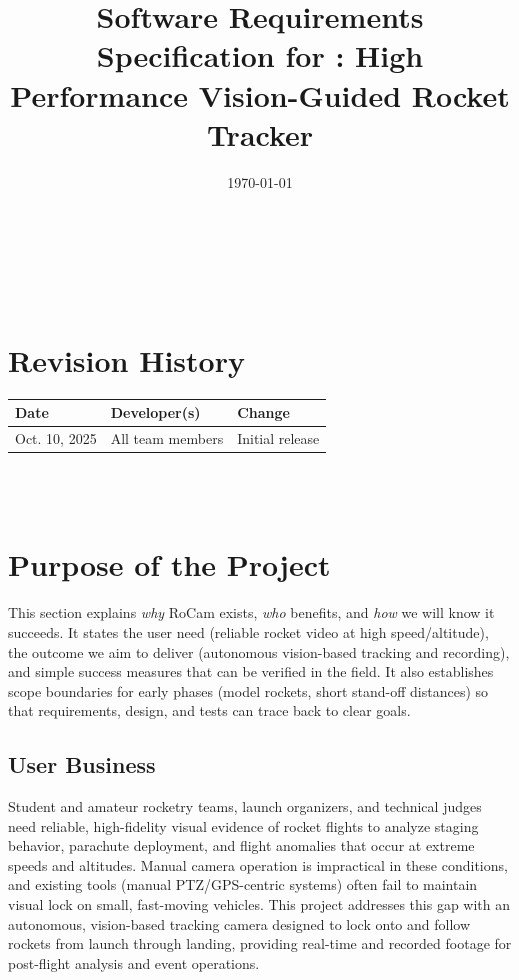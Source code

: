 \documentclass[12pt]{article}
\begin{document}
\title{Software Requirements Specification for \progname: High Performance Vision-Guided Rocket Tracker}
\author{\authname}
\date{\today}

\maketitle

~\newpage

\tableofcontents

~\newpage

\section*{Revision History}

\begin{tabularx}{\textwidth}{llX}
  \toprule {\textbf{Date}} & {\textbf{Developer(s)}} & {\textbf{Change}} \\
  \midrule
  Oct. 10, 2025            & All team members        & Initial release   \\
  \bottomrule
\end{tabularx}

~\\

~\newpage
\section{Purpose of the Project}
This section explains \emph{why} RoCam exists, \emph{who} benefits, and \emph{how} we will know it succeeds.
It states the user need (reliable rocket video at high speed/altitude), the outcome we aim to deliver
(autonomous vision-based tracking and recording), and simple success measures that can be verified in the field.
It also establishes scope boundaries for early phases (model rockets, short stand-off distances) so that
requirements, design, and tests can trace back to clear goals.
\subsection{User Business}

Student and amateur rocketry teams, launch organizers, and technical judges
need reliable, high-fidelity visual evidence of rocket flights to analyze
staging behavior, parachute deployment, and flight anomalies that occur at
extreme speeds and altitudes. Manual camera operation is impractical in these
conditions, and existing tools (manual PTZ/GPS-centric systems) often fail to
maintain visual lock on small, fast-moving vehicles. This project addresses
this gap with an autonomous, vision-based tracking camera designed to lock onto
and follow rockets from launch through landing, providing real-time and
recorded footage for post-flight analysis and event operations.
\end{document}
